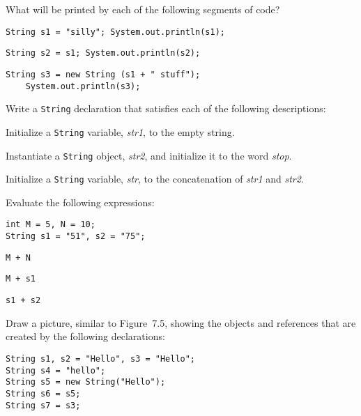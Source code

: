 \begin{SSTUDY}
\item  What will be printed by each of the following segments of code?
\begin{EXRLL}
\item  \verb|String s1 = "silly"; System.out.println(s1);|
\item  \verb|String s2 = s1; System.out.println(s2);|
\item  \verb|String s3 = new String (s1 + " stuff");|
       \\ \verb|    System.out.println(s3);|
\end{EXRLL}

\item  Write a {\tt String} declaration that satisfies each
of the following descriptions:
\begin{EXRLL}
\item  Initialize a {\tt String} variable, {\it str1}, to the empty
        string.
\item  Instantiate a {\tt String} object, {\it str2}, and initialize
        it to the word {\it stop}.
\item  Initialize a {\tt String} variable, {\it str}, to the concatenation of
{\it str1} and {\it str2}.
\end{EXRLL}

\item  Evaluate the following expressions:

\begin{jjjlisting}
\begin{lstlisting}
int M = 5, N = 10;
String s1 = "51", s2 = "75";
\end{lstlisting}
\end{jjjlisting}

\begin{EXRLL}
\begin{multicols}{3}
\item \verb|M + N|
\item \verb|M + s1|
\item \verb|s1 + s2|     
\end{multicols}
\end{EXRLL}


\item  Draw a picture, similar to Figure~7.5, showing the
objects and references that are created by the following declarations:
\begin{jjjlisting}
\begin{lstlisting}
String s1, s2 = "Hello", s3 = "Hello";
String s4 = "hello";
String s5 = new String("Hello");
String s6 = s5;
String s7 = s3;
\end{lstlisting}
\end{jjjlisting}

\end{SSTUDY}

